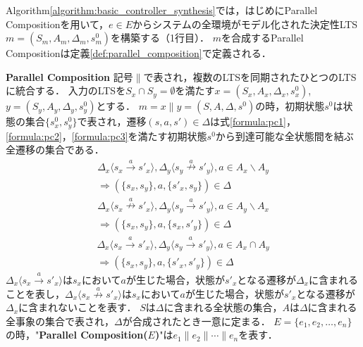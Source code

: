 Algorithm\ref{algorithm:basic_controller_synthesis}では，はじめにParallel Compositionを用いて，$e \in E$からシステムの全環境がモデル化された決定性LTS $m = (S_{m}, A_{m}, \Delta_{m}, s^0_{m})$を構築する（1行目）．
$m$を合成するParallel Compositionは定義\ref{def:parallel_composition}で定義される．
\begin{dfn}{\textbf{Parallel Composition}}
\label{def:parallel_composition}
    記号$\parallel$で表され，複数のLTSを同期されたひとつのLTSに統合する．
    入力のLTSを$S_{x} \cap S_{y} = \emptyset$を満たす$x = (S_{x}, A_{x}, \Delta_{x}, s^0_{x})$,
    $y = (S_{y}, A_{y}, \Delta_{y}, s^0_{y})$とする．
    $m = x \parallel y = (S, A, \Delta, s^0)$の時，初期状態$s^0$は状態の集合$\{ s^0_{x}, s^0_{y} \}$で表され，遷移$(s,a,s')\in\Delta$は式\ref{formula:pc1}，\ref{formula:pc2}，\ref{formula:pc3}を満たす初期状態$s^0$から到達可能な全状態間を結ぶ全遷移の集合である．
    \begin{multline}
    \label{formula:pc1}
    \Delta_x \langle s_{x} \overset{a}{\rightarrow} s'_{x} \rangle, \Delta_y \langle s_{y} \overset{a}{\nrightarrow} s'_{y} \rangle, a \in A_{x} \backslash A_{y}\\
    \Rightarrow (\{ s_{x},s_{y} \},a,\{ s'_{x},s_{y} \} ) \in \Delta
    \end{multline}
    \begin{multline}
    \label{formula:pc2}
    \Delta_x \langle s_{x} \overset{a}{\nrightarrow} s'_{x} \rangle, \Delta_y \langle s_{y} \overset{a}{\rightarrow} s'_{y} \rangle, a \in A_{y} \backslash A_{x}\\
    \Rightarrow (\{ s_{x},s_{y} \},a,\{ s_{x},s'_{y} \}) \in \Delta
    \end{multline}
    \begin{multline}
    \label{formula:pc3}
    \Delta_x \langle s_{x} \overset{a}{\rightarrow} s'_{x} \rangle, \Delta_y \langle s_{y} \overset{a}{\rightarrow} s'_{y} \rangle, a \in A_{x} \cap A_{y}\\
    \Rightarrow (\{ s_{x},s_{y} \},a,\{ s'_{x},s'_{y} \}) \in \Delta
    \end{multline}
    $\Delta_x \langle s_{x} \overset{a}{\rightarrow} s'_{x} \rangle$は$s_{x}$において$a$が生じた場合，状態が$s'_{x}$となる遷移が$\Delta_x$に含まれることを表し，$\Delta_x \langle s_{x} \overset{a}{\nrightarrow} s'_{x} \rangle$は$s_{x}$において$a$が生じた場合，状態が$s'_{x}$となる遷移が$\Delta_x$に含まれないことを表す．
    $S$は$\Delta$に含まれる全状態の集合，$A$は$\Delta$に含まれる全事象の集合で表され，$\Delta$が合成されたとき一意に定まる．
    $E = \{e_1, e_2, \ldots, e_n\}$の時，"{\bf Parallel Composition($E$)}"は$e_1 \parallel e_2 \parallel \cdots \parallel e_n$を表す．
\end{dfn}

